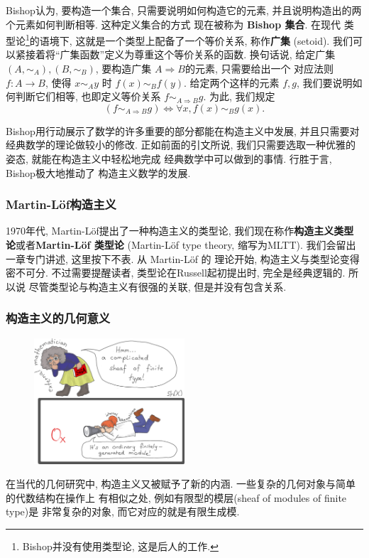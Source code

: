 \documentclass[UTF8]{ctexbook}
\theoremstyle{plain}
\theoremstyle{definition}
\theoremstyle{remark}
\begin{document}
Bishop认为, 要构造一个集合, 只需要说明如何构造它的元素,
并且说明构造出的两个元素如何判断相等. 这种定义集合的方式
现在被称为 \textbf{Bishop 集合}. 在现代
类型论\footnote{Bishop并没有使用类型论, 这是后人的工作.}的语境下,
这就是一个类型上配备了一个等价关系, 称作\textbf{广集} (setoid).
我们可以紧接着将“广集函数”定义为尊重这个等价关系的函数.
换句话说, 给定广集 \((A, \sim_A),(B, \sim_B)\),
要构造广集 \(A \Rightarrow B\)的元素, 只需要给出一个
对应法则 \(f : A \to B\), 使得 \(x \sim_A y\) 时
\(f(x) \sim_B f(y)\). 给定两个这样的元素 \(f,g\),
我们要说明如何判断它们相等, 也即定义等价关系
\(f \sim_{A\Rightarrow B} g\). 为此, 我们规定
\[(f \sim_{A\Rightarrow B} g) \iff \forall x, f(x) \sim_B g(x).\]

Bishop用行动展示了数学的许多重要的部分都能在构造主义中发展,
并且只需要对经典数学的理论做较小的修改. 正如前面的引文所说,
我们只需要选取一种优雅的姿态, 就能在构造主义中轻松地完成
经典数学中可以做到的事情. 行胜于言, Bishop极大地推动了
构造主义数学的发展.

\subsubsection{Martin-L\"of构造主义}
1970年代, Martin-L\"of提出了一种构造主义的类型论,
我们现在称作\textbf{构造主义类型论}或者\textbf{Martin-L\"of 类型论}
(Martin-L\"of type theory, 缩写为MLTT).
我们会留出一章专门讲述, 这里按下不表. 从 Martin-L\"of 的
理论开始, 构造主义与类型论变得密不可分. 不过需要提醒读者,
类型论在Russell起初提出时, 完全是经典逻辑的. 所以说
尽管类型论与构造主义有很强的关联, 但是并没有包含关系.

\subsubsection{构造主义的几何意义}
\begin{figure}[h]
\centering
\includegraphics[width=0.5\textwidth]{external-internal-small.png}
\end{figure}
在当代的几何研究中, 构造主义又被赋予了新的内涵.
一些复杂的几何对象与简单的代数结构在操作上
有相似之处, 例如有限型的模层(sheaf of modules of finite type)是
非常复杂的对象, 而它对应的就是有限生成模.
\end{document}
